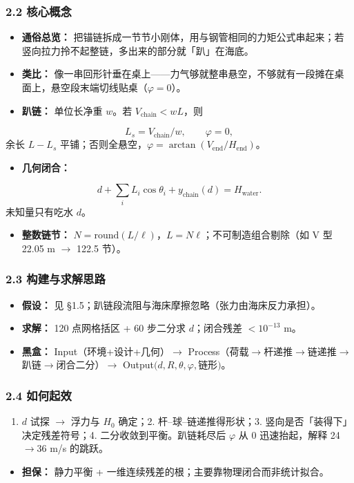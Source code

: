 \documentclass[UTF8,a4paper,zihao=-4]{ctexart}
\begin{document}
\subsubsection{\texorpdfstring{2.2 核心概念}{2.2 核心概念}}
\begin{itemize}[leftmargin=1.5em]
\item \textbf{通俗总览：} 把锚链拆成一节节小刚体，用与钢管相同的力矩公式串起来；若竖向拉力拎不起整链，多出来的部分就「趴」在海底。
\item \textbf{类比：} 像一串回形针垂在桌上------力气够就整串悬空，不够就有一段摊在桌面上，悬空段末端切线贴桌（\(\varphi=0\)）。
\item \textbf{趴链：} 单位长净重 \(w\)。若 \(V_{\mathrm{chain}}<wL\)，则
\end{itemize}
  \[
  L_s=V_{\mathrm{chain}}/w,\qquad \varphi=0,
  \]
  余长 \(L-L_s\) 平铺；否则全悬空，\(\varphi=\arctan(V_{\mathrm{end}}/H_{\mathrm{end}})\)。
\begin{itemize}[leftmargin=1.5em]
\item \textbf{几何闭合：}
\end{itemize}
  \[
  d+\sum_i L_i\cos\theta_i+y_{\mathrm{chain}}(d)=H_{\mathrm{water}}.
  \]
  未知量只有吃水 \(d\)。
\begin{itemize}[leftmargin=1.5em]
\item \textbf{整数链节：} \(N=\mathrm{round}(L/\ell)\)，\(L=N\ell\)；不可制造组合剔除（如 V 型 22.05 m $\rightarrow$ 122.5 节）。
\end{itemize}

\subsubsection{\texorpdfstring{2.3 构建与求解思路}{2.3 构建与求解思路}}
\begin{itemize}[leftmargin=1.5em]
\item \textbf{假设：} 见 §1.5；趴链段流阻与海床摩擦忽略（张力由海床反力承担）。
\item \textbf{求解：} 120 点网格括区 + 60 步二分求 \(d\)；闭合残差 \(<10^{-13}\) m。
\item \textbf{黑盒：} Input（环境+设计+几何）$\rightarrow$ Process（荷载$\rightarrow$杆递推$\rightarrow$链递推$\rightarrow$趴链$\rightarrow$闭合二分）$\rightarrow$ Output\((d,R,\theta,\varphi,\)链形\()\)。
\end{itemize}

\subsubsection{\texorpdfstring{2.4 如何起效}{2.4 如何起效}}
\begin{enumerate}[leftmargin=1.8em]
\item \(d\) 试探 $\rightarrow$ 浮力与 \(H_0\) 确定；2. 杆--球--链递推得形状；3. 竖向是否「装得下」决定残差符号；4. 二分收敛到平衡。趴链耗尽后 \(\varphi\) 从 0 迅速抬起，解释 24$\rightarrow$36 m/s 的跳跃。  
\end{enumerate}
\begin{itemize}[leftmargin=1.5em]
\item \textbf{担保：} 静力平衡 + 一维连续残差的根；主要靠物理闭合而非统计拟合。
\end{itemize}
\end{document}
